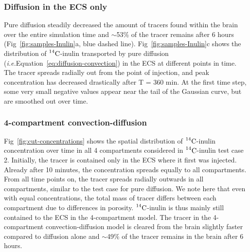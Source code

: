 \documentclass[10pt]{article}
\newcommand{\ie}{\emph{i.e.}\;}
\newcommand{\1}{^{(1)}}
\newcommand{\2}{^{(2)}}
\newcommand{\Cinulin}{$\prescript{14}{}{\text{C}}$-inulin }
\begin{document}
\subsubsection{Diffusion in the ECS only}
Pure diffusion steadily decreased the amount of tracers found within the brain over the entire simulation time and $\sim$53\% of the tracer remains after 6 hours (Fig~\ref{fig:samples-Inulin}a, blue dashed line). Fig~\ref{fig:samples-Inulin}c shows the distribution of \Cinulin transported by pure diffusion (\ie Equation~\eqref{eq:diffusion-convection}) in the ECS at different points in time. The tracer spreads radially out from the point of injection, and peak concentration has decreased drastically after T = 360 min. At the first time step, some very small negative values appear near the tail of the Gaussian curve, but are smoothed out over time. 

\subsubsection{4-compartment convection-diffusion}
\label{subsec:baseline2}

Fig~\ref{fig:cut-concentrations} shows the spatial distribution of \Cinulin concentration over time in all 4 compartments considered in \Cinulin test case 2. Initially, the tracer is contained only in the ECS where it first was injected. Already after 10 minutes, the concentration spreads equally to all compartments. From all time points on, the tracer spreads radially outwards in all compartments, similar to the test case for pure diffusion. We note here that even with equal concentrations, the total mass of tracer differs between each compartment due to differences in porosity. \Cinulin is thus mainly still contained to the ECS in the 4-compartment model. The tracer in the 4-compartment convection-diffusion model is cleared from the brain slightly faster compared to diffusion alone and $\sim$49\% of the tracer remains in the brain after 6 hours. 


\end{document}
